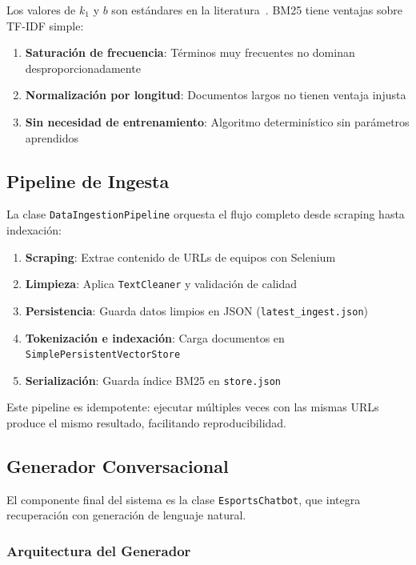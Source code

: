 Los valores de $k_1$ y $b$ son estándares en la literatura~\cite{robertson2009probabilistic}. BM25 tiene ventajas sobre TF-IDF simple:

\begin{enumerate}
    \item \textbf{Saturación de frecuencia}: Términos muy frecuentes no dominan desproporcionadamente
    \item \textbf{Normalización por longitud}: Documentos largos no tienen ventaja injusta
    \item \textbf{Sin necesidad de entrenamiento}: Algoritmo determinístico sin parámetros aprendidos
\end{enumerate}

\subsection{Pipeline de Ingesta}

La clase \texttt{DataIngestionPipeline} orquesta el flujo completo desde scraping hasta indexación:

\begin{enumerate}
    \item \textbf{Scraping}: Extrae contenido de URLs de equipos con Selenium
    \item \textbf{Limpieza}: Aplica \texttt{TextCleaner} y validación de calidad
    \item \textbf{Persistencia}: Guarda datos limpios en JSON (\texttt{latest\_ingest.json})
    \item \textbf{Tokenización e indexación}: Carga documentos en \texttt{SimplePersistentVectorStore}
    \item \textbf{Serialización}: Guarda índice BM25 en \texttt{store.json}
\end{enumerate}

Este pipeline es idempotente: ejecutar múltiples veces con las mismas URLs produce el mismo resultado, facilitando reproducibilidad.

\subsection{Generador Conversacional}

El componente final del sistema es la clase \texttt{EsportsChatbot}, que integra recuperación con generación de lenguaje natural.

\subsubsection{Arquitectura del Generador}

